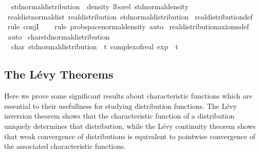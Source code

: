 \documentclass[leqno]{article}
\theoremstyle{definition}
\begin{document}
\medskip

\begin{isabellebody}
\isamarkupfalse%
\isanewline
\ \ {\isachardoublequoteopen}std{\isacharunderscore}normal{\isacharunderscore}distribution\ {\isasymequiv}\ density\ lborel\ std{\isacharunderscore}normal{\isacharunderscore}density{\isachardoublequoteclose}\isanewline
\isanewline
\isanewline
{}\isamarkupfalse%
\ real{\isacharunderscore}dist{\isacharunderscore}normal{\isacharunderscore}dist{\isacharcolon}\ {\isachardoublequoteopen}real{\isacharunderscore}distribution\ std{\isacharunderscore}normal{\isacharunderscore}distribution{\isachardoublequoteclose}\isanewline
{}\isamarkupfalse%
\ real{\isacharunderscore}distribution{\isacharunderscore}def\isanewline
\ \ \isamarkupfalse%
\ {\isacharparenleft}rule\ conjI{\isacharparenright}\isanewline
\ \ \isamarkupfalse%
\ {\isacharparenleft}rule\ prob{\isacharunderscore}space{\isacharunderscore}normal{\isacharunderscore}density{\isacharcomma}\ auto{\isacharparenright}\isanewline
{}\isamarkupfalse%
\ real{\isacharunderscore}distribution{\isacharunderscore}axioms{\isacharunderscore}def\ \isamarkupfalse%
\ auto
\isanewline
\isanewline
{}\isamarkupfalse%
\ char{\isacharunderscore}std{\isacharunderscore}normal{\isacharunderscore}distribution{\isacharcolon}\isanewline
\ \ {\isachardoublequoteopen}char\ std{\isacharunderscore}normal{\isacharunderscore}distribution\ {\isacharequal}\ {\isacharparenleft}{\isasymlambda}t{\isachardot}\ complex{\isacharunderscore}of{\isacharunderscore}real\ {\isacharparenleft}exp\ {\isacharparenleft}{\isacharminus}\ {\isacharparenleft}t{\isacharcircum}{}{\isacharparenright}\ {\isacharslash}\ {}{\isacharparenright}{\isacharparenright}{\isacharparenright}{\isachardoublequoteclose}
\end{isabellebody}

\subsection{The L\'evy Theorems}

Here we prove some significant results about characteristic functions which are essential to their usefullness for studying distribution functions. The L\'evy inversion theorem shows that the characteristic function of a distribution uniquely determines that distribution, while the L\'evy continuity theorem shows that weak convergence of distributions is equivalent to pointwise convergence of the associated characteristic functions.
\end{document}
